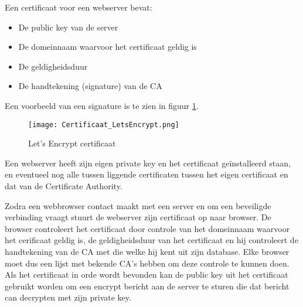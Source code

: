 Een certificaat voor een webserver bevat:
\begin{itemize}
\item De public key van de server
\item De domeinnaam waarvoor het certificaat geldig is
\item De geldigheidsduur
\item De handtekening (signature) van de CA
\end{itemize}

Een voorbeeld van een signature is te zien in figuur \ref{img:cert:letsencrypt}.

\begin{figure}[h]
\centering
\texttt{[image: Certificaat\_LetsEncrypt.png]}
\caption{Let's Encrypt certificaat}
\label{img:cert:letsencrypt}
\end{figure}

Een webserver heeft zijn eigen private key en het certificaat ge\"installeerd staan, en eventueel nog alle tussen liggende certificaten tussen het eigen certificaat en dat van de Certificate Authority.

Zodra een webbrowser contact maakt met een server en om een beveiligde verbinding vraagt stuurt de webserver zijn certificaat op naar browser. De browser controleert het certificaat door controle van het domeinnaam waarvoor het cerificaat geldig is, de geldigheidsduur van het certificaat en hij controleert de handtekening van de CA met die welke hij kent uit zijn database. Elke browser moet dus een lijst met bekende CA's hebben om deze controle te kunnen doen. Als het certificaat in orde wordt bevonden kan de public key uit het certificaat gebruikt worden om een encrypt bericht aan de server te sturen die dat bericht can decrypten met zijn private key.
